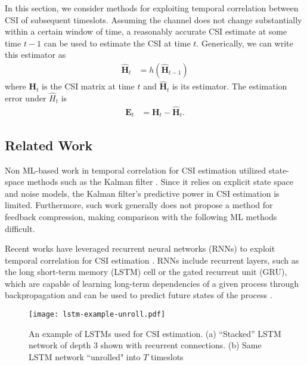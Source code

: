 In this section, we consider methods for exploiting temporal correlation between CSI of subsequent timeslots.
Assuming the channel does not change substantially within a certain window of time,
a reasonably accurate CSI estimate at some time $t-1$ can be used to estimate the CSI at time $t$.
Generically, we can write this estimator as
\begin{align}
\hat{\mathbf H}_t &= h(\hat{\mathbf H}_{t-1}) \label{eq:gen_estim}
\end{align}
where $\mathbf{H}_t$ is the CSI matrix at time $t$ and $\hat{\mathbf H}_t$ is its estimator. 
The estimation error under $\hat H_t$ is
\begin{align}
\mathbf E_{t} &= \mathbf H_{t} - \hat{\mathbf H}_{t}. \label{eq:diff_err}
\end{align}

\subsection{Related Work}

Non ML-based work in temporal correlation for CSI estimation utilized state-space methods such as the Kalman filter \cite{ref:Huber2006improved,ref:Ali2020BayesKalmanFilter,ref:Kim2021KalmanVsML}. Since it relies on explicit state space and noise models, the Kalman filter's predictive power in CSI estimation is limited. Furthermore, such work generally does not propose a method for feedback compression, making comparison with the following ML methods difficult.

Recent works have leveraged recurrent neural networks (RNNs) to exploit temporal correlation for CSI estimation \cite{ref:Lu2019RecCsiNet, ref:Liao2019BiLSTM, ref:Li2020SpatTempLSTM,
 ref:Jang2019Delay,ref:Wang2019CsiNetLSTM}. RNNs include recurrent layers, such as the long short-term memory (LSTM) cell or the gated recurrent unit (GRU), which are capable of learning long-term dependencies of a given process through backpropagation \cite{ref:Hermans2013Training} and can be used to predict future states of the process \cite{ref:Pascanu2014HowTo}.

\begin{figure}[htb]
	\centering
	\texttt{[image: lstm-example-unroll.pdf]}
	\medskip
	\caption{An example of LSTMs used for CSI estimation. (a) ``Stacked'' LSTM network of depth 3 shown with recurrent connections. (b) Same LSTM network ``unrolled" into $T$ timeslots }
	\label{fig:lstm_example}
\end{figure}

